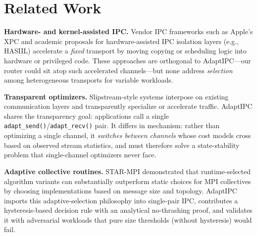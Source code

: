 \documentclass[conference]{IEEEtran}
\begin{document}
\section{Related Work}
\textbf{Hardware- and kernel-assisted IPC.} Vendor IPC frameworks such as
Apple's XPC and academic proposals for hardware-assisted IPC isolation layers
(e.g., HASIIL) accelerate a \emph{fixed} transport by moving copying or
scheduling logic into hardware or privileged code. These approaches are
orthogonal to AdaptIPC---our router could sit atop such accelerated
channels---but none address \emph{selection} among heterogeneous transports
for variable workloads.

\textbf{Transparent optimizers.} Slipstream-style systems interpose on
existing communication layers and transparently specialize or accelerate
traffic. AdaptIPC shares the transparency goal: applications call a single
\texttt{adapt\_send()}/\texttt{adapt\_recv()} pair. It differs in mechanism:
rather than optimizing a single channel, it \emph{switches between channels}
whose cost models cross based on observed stream statistics, and must
therefore solve a state-stability problem that single-channel optimizers
never face.

\textbf{Adaptive collective routines.} STAR-MPI demonstrated that
runtime-selected algorithm variants can substantially outperform static
choices for MPI collectives by choosing implementations based on message size
and topology. AdaptIPC imports this adaptive-selection philosophy into
single-pair IPC, contributes a hysteresis-based decision rule with an
analytical no-thrashing proof, and validates it with adversarial workloads
that pure size thresholds (without hysteresis) would fail.
\end{document}
